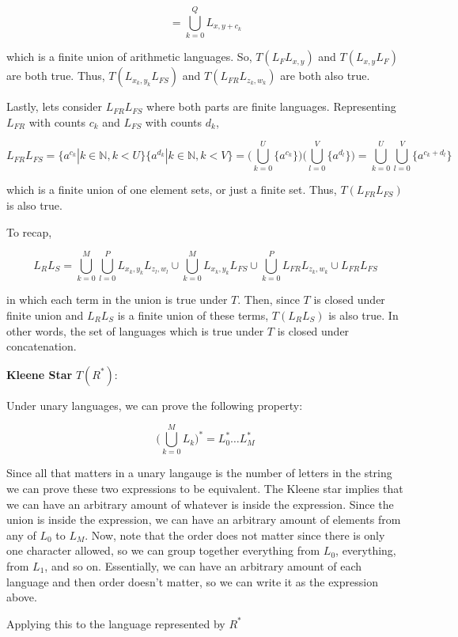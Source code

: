 \documentclass[11pt]{article}
\begin{document}
\begin{enumerate}
    $$ = \bigcup_{k=0}^Q L_{x, y+c_k}$$

    which is a finite union of arithmetic languages. So, $T(L_F L_{x, y})$ and $T(L_{x, y} L_F)$ are both true. Thus, $T(L_{x_k, y_k}L_{FS})$ and $T(L_{FR}L_{z_k, w_k})$ are both also true.

    Lastly, lets consider $L_{FR} L_{FS}$ where both parts are finite languages. Representing $L_{FR}$ with counts $c_k$ and $L_{FS}$ with counts $d_k$, 

    $$ L_{FR} L_{FS} = \{ a^{c_k} | k \in \mathbb{N}, k < U \} \{ a^{d_k} | k \in \mathbb{N}, k < V \} = \big( \bigcup_{k=0}^U \{ a^{c_k} \} \big) \big( \bigcup_{l=0}^V \{ a^{d_l} \} \big) = \bigcup_{k=0}^U \bigcup_{l=0}^V \{ a^{c_k + d_l} \}$$

    which is a finite union of one element sets, or just a finite set. Thus, $T(L_{FR}L_{FS})$ is also true.

    To recap,

    $$L_R L_S = \bigcup_{k=0}^{M} \bigcup_{l=0}^{P} L_{x_k, y_k} L_{z_l, w_l} \cup \bigcup_{k=0}^{M} L_{x_k, y_k}L_{FS} \cup \bigcup_{k=0}^{P} L_{FR}L_{z_k, w_k} \cup L_{FR}L_{FS}$$

    in which each term in the union is true under $T$. Then, since $T$ is closed under finite union and $L_R L_S$ is a finite union of these terms, $T(L_R L_S)$ is also true. In other words, the set of languages which is true under $T$ is closed under concatenation. 

    \textbf{Kleene Star} $T(R^*)$:

    Under unary languages, we can prove the following property:

    $$ \big( \bigcup_{k=0}^M L_k \big)^* = L_0^*\dots L_M^* $$

    Since all that matters in a unary langauge is the number of letters in the string we can prove these two expressions to be equivalent. The Kleene star implies that we can have an arbitrary amount of whatever is inside the expression. Since the union is inside the expression, we can have an arbitrary amount of elements from any of $L_0$ to $L_M$. Now, note that the order does not matter since there is only one character allowed, so we can group together everything from $L_0$, everything, from $L_1$, and so on. Essentially, we can have an arbitrary amount of each language and then order doesn't matter, so we can write it as the expression above.

    Applying this to the language represented by $R^*$


\end{enumerate}
\end{document}
